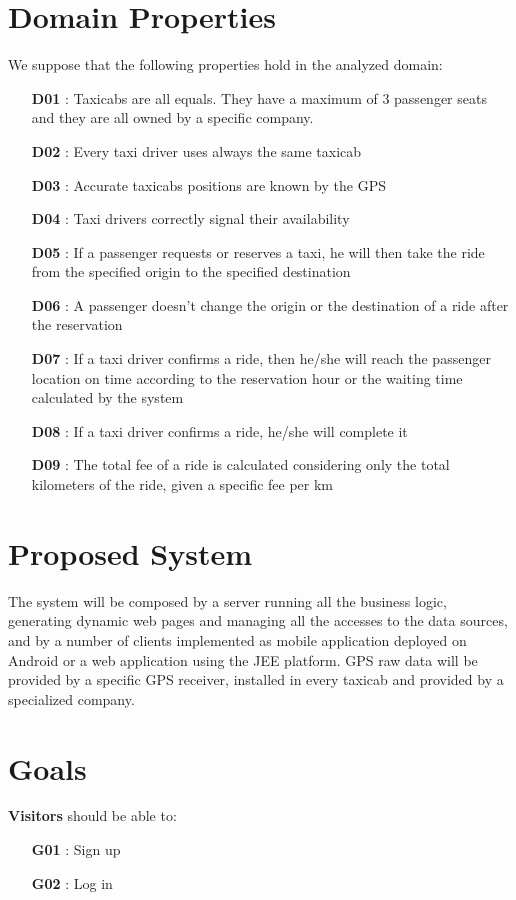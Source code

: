 \section{Domain Properties}
\noindent We suppose that the following properties hold in the analyzed domain:
\begin{itemize}
	\item [\textbf{D01}] : Taxicabs are all equals. They have a maximum of 3 passenger seats and they are all owned by a specific company.
	\item [\textbf{D02}] : Every taxi driver uses always the same taxicab
	\item [\textbf{D03}] : Accurate taxicabs positions are known by the GPS
	\item [\textbf{D04}] : Taxi drivers correctly signal their availability
	\item [\textbf{D05}] : If a passenger requests or reserves a taxi, he will then take the ride from the specified origin to the specified destination
	\item [\textbf{D06}] : A passenger doesn't change the origin or the destination of a ride after the reservation
	\item [\textbf{D07}] : If a taxi driver confirms a ride, then he/she will reach the passenger location on time according to the reservation hour or the waiting time calculated by the system
	\item [\textbf{D08}] : If a taxi driver confirms a ride, he/she will complete it
	\item [\textbf{D09}] : The total fee of a ride is calculated considering only the total kilometers of the ride, given a specific fee per km
\end{itemize}

\section{Proposed System}
The system will be composed by a server running all the business logic, generating dynamic web pages and managing all the accesses to the data sources, and by a number of clients implemented as mobile application deployed on Android or a web application using the JEE platform. GPS raw data will be provided by a specific GPS receiver, installed in every taxicab and provided by a specialized company.

\section{Goals}
\noindent \textbf{Visitors} should be able to:
\begin{itemize}
	\item [\textbf{G01}] : Sign up 
	\item [\textbf{G02}] : Log in\\
\end{itemize}

